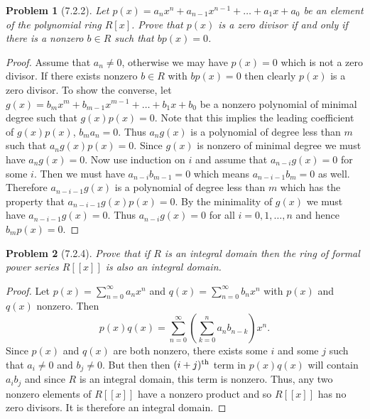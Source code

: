 \documentclass{article}
\newtheorem{problem}{Problem}
\begin{document}
\begin{problem}[7.2.2]
Let $p(x) = a_nx^n + a_{n-1}x^{n-1} + \dots + a_1x + a_0$ be an element of the polynomial ring $R[x]$. Prove that $p(x)$ is a zero divisor if and only if there is a nonzero $b \in R$ such that $bp(x) = 0$.
\end{problem}
\begin{proof}
Assume that $a_n \neq 0$, otherwise we may have $p(x) = 0$ which is not a zero divisor. If there exists nonzero $b \in R$ with $bp(x) = 0$ then clearly $p(x)$ is a zero divisor. To show the converse, let $g(x) = b_mx^m + b_{m-1}x^{m-1} + \dots + b_1x + b_0$ be a nonzero polynomial of minimal degree such that $g(x)p(x) = 0$. Note that this implies the leading coefficient of $g(x)p(x)$, $b_ma_n = 0$. Thus $a_ng(x)$ is a polynomial of degree less than $m$ such that $a_ng(x)p(x) = 0$. Since $g(x)$ is nonzero of minimal degree we must have $a_ng(x) = 0$. Now use induction on $i$ and assume that $a_{n-i}g(x) = 0$ for some $i$. Then we must have $a_{n-i}b_{m-1} = 0$ which means $a_{n-i-1}b_m = 0$ as well. Therefore $a_{n-i-1}g(x)$ is a polynomial of degree less than $m$ which has the property that $a_{n-i-1}g(x)p(x) = 0$. By the minimality of $g(x)$ we must have $a_{n-i-1}g(x) = 0$. Thus $a_{n-i}g(x) = 0$ for all $i = 0, 1, \dots , n$ and hence $b_mp(x) = 0$.
\end{proof}

\begin{problem}[7.2.4]
Prove that if $R$ is an integral domain then the ring of formal power series $R[[x]]$ is also an integral domain.
\end{problem}
\begin{proof}
Let $p(x) = \sum_{n=0}^{\infty} a_nx^n$ and $q(x) = \sum_{n=0}^{\infty} b_nx^n$ with $p(x)$ and $q(x)$ nonzero. Then
\[
p(x)q(x) = \sum_{n=0}^{\infty} \left ( \sum_{k=0}^{n} a_nb_{n-k} \right ) x^n.
\]
Since $p(x)$ and $q(x)$ are both nonzero, there exists some $i$ and some $j$ such that $a_i \neq 0$ and $b_j \neq 0$. But then then $(i+j)^{\textup{th}}$ term in $p(x)q(x)$ will contain $a_ib_j$ and since $R$ is an integral domain, this term is nonzero. Thus, any two nonzero elements of $R[[x]]$ have a nonzero product and so $R[[x]]$ has no zero divisors. It is therefore an integral domain.
\end{proof}
\end{document}
